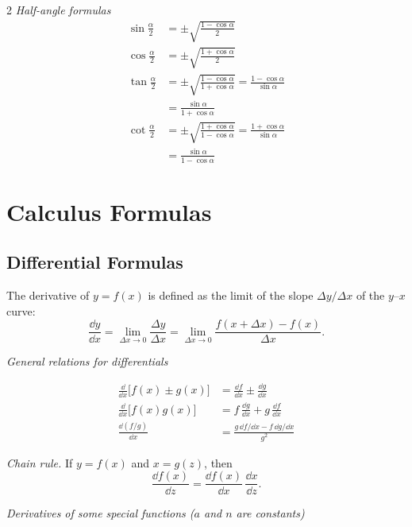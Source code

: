 \begin{multicols}{2}
\textit{Half-angle formulas}
\begin{align*}
\sin\frac{\alpha}{2} &= \pm\sqrt{\frac{1-\cos\alpha}{2}}\\
\cos\frac{\alpha}{2} &= \pm\sqrt{\frac{1+\cos\alpha}{2}}\\
\tan\frac{\alpha}{2} &= \pm\sqrt{\frac{1-\cos\alpha}{1+\cos\alpha}}=\frac{1-\cos\alpha}{\sin\alpha}\\
&= \frac{\sin\alpha}{1+\cos\alpha}\\
\cot\frac{\alpha}{2} &= \pm\sqrt{\frac{1+\cos\alpha}{1-\cos\alpha}}=\frac{1+\cos\alpha}{\sin\alpha}\\
&= \frac{\sin\alpha}{1-\cos\alpha}
\end{align*}

\end{multicols}

\section*{Calculus Formulas}

\subsection*{Differential Formulas}

The derivative of $y=f(x)$ is defined as the limit of the slope $\Delta y/\Delta x$ of the $y$--$x$ curve:
\[
\frac{\dd y}{\dd x}=\lim_{\Delta x\to0}\frac{\Delta y}{\Delta x}
=\lim_{\Delta x\to0}\frac{f(x+\Delta x)-f(x)}{\Delta x}.
\]

\textit{General relations for differentials}

\begin{align*}
\frac{\dd}{\dd x}\bigl[f(x)\pm g(x)\bigr] &= \frac{\dd f}{\dd x}\pm\frac{\dd g}{\dd x}\\
\frac{\dd}{\dd x}\bigl[f(x)g(x)\bigr] &= f\,\frac{\dd g}{\dd x}+g\,\frac{\dd f}{\dd x}\\
\frac{\dd(f/g)}{\dd x} &= \frac{g\,\dd f/\dd x-f\,\dd g/\dd x}{g^2}
\end{align*}

\textit{Chain rule.} If $y=f(x)$ and $x=g(z)$, then
\[
\frac{\dd f(x)}{\dd z}=\frac{\dd f(x)}{\dd x}\,\frac{\dd x}{\dd z}.
\]

\textit{Derivatives of some special functions ($a$ and $n$ are constants)}

